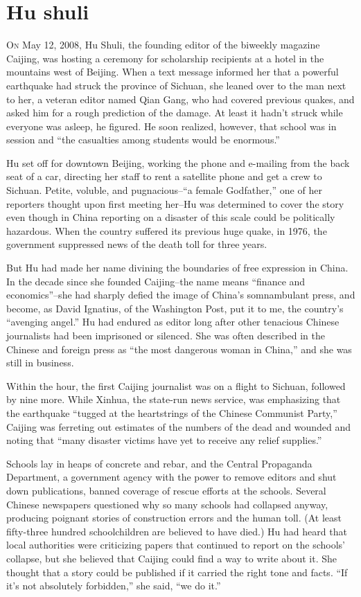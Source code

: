 ﻿\documentclass[12pt]{article}
\begin{document}
\section{Hu shuli}

\lettrine{O}{n} May 12, 2008, Hu Shuli, the founding editor of the biweekly
magazine Caijing, was hosting a ceremony for scholarship recipients at a hotel in the mountains west
of Beijing. When a text message informed her that a powerful earthquake had struck the province of
Sichuan, she leaned over to the man next to her, a veteran editor named Qian Gang, who had covered
previous quakes, and asked him for a rough prediction of the damage. At least it hadn't struck while
everyone was asleep, he figured. He soon realized, however, that school was in session and ``the
casualties among students would be enormous.''

Hu set off for downtown Beijing, working the phone and e-mailing from the back seat of a car,
directing her staff to rent a satellite phone and get a crew to Sichuan. Petite, voluble, and
pugnacious--``a female Godfather,'' one of her reporters thought upon first meeting her--Hu was
determined to cover the story even though in China reporting on a disaster of this scale could be
politically hazardous. When the country suffered its previous huge quake, in 1976, the government
suppressed news of the death toll for three years.

But Hu had made her name divining the boundaries of free expression in China. In the decade since
she founded Caijing--the name means ``finance and economics''--she had sharply defied the image of
China's somnambulant press, and become, as David Ignatius, of the Washington Post, put it to me, the
country's ``avenging angel.'' Hu had endured as editor long after other tenacious Chinese
journalists had been imprisoned or silenced. She was often described in the Chinese and foreign
press as ``the most dangerous woman in China,'' and she was still in business.

Within the hour, the first Caijing journalist was on a flight to Sichuan, followed by nine more.
While Xinhua, the state-run news service, was emphasizing that the earthquake ``tugged at the
heartstrings of the Chinese Communist Party,'' Caijing was ferreting out estimates of the numbers of
the dead and wounded and noting that ``many disaster victims have yet to receive any relief
supplies.''

Schools lay in heaps of concrete and rebar, and the Central Propaganda Department, a government
agency with the power to remove editors and shut down publications, banned coverage of rescue
efforts at the schools. Several Chinese newspapers questioned why so many schools had collapsed
anyway, producing poignant stories of construction errors and the human toll. (At least fifty-three
hundred schoolchildren are believed to have died.) Hu had heard that local authorities were
criticizing papers that continued to report on the schools' collapse, but she believed that Caijing
could find a way to write about it. She thought that a story could be published if it carried the
right tone and facts. ``If it's not absolutely forbidden,'' she said, ``we do it.''
\end{document}
